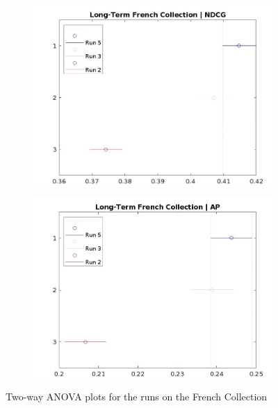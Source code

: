 \begin{figure}[!h]
    \centering
    \begin{subfigure}[b]{0.49\textwidth}
      \centering
      \includegraphics[width=\textwidth]{figure/StatisticalAnalysis/ANOVA 2/ndcg-lt-fr.jpeg}
      \label{fig:lt_anova_french_ndcg}
    \end{subfigure}
    \hfill
    \begin{subfigure}[b]{0.49\textwidth}
      \centering
      \includegraphics[width=\textwidth]{figure/StatisticalAnalysis/ANOVA 2/ap-lt-fr.jpeg}
      \label{fig:lt_anova_french_ap}
    \end{subfigure}
    \caption{Two-way \ac{ANOVA} plots for the runs on the French Collection}
    \label{fig:lt_anova_french}
  \end{figure}

